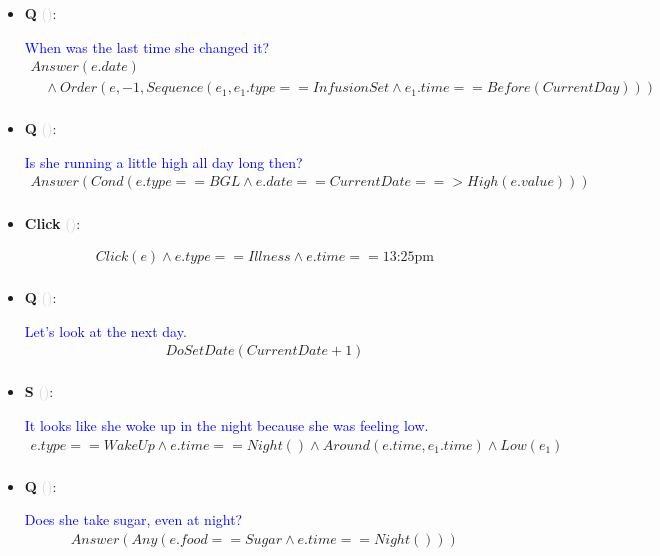 \documentclass[11pt]{article}
\newcounter{CQ}
\newcounter{CS}
\newcounter{CClick}
\newcommand{\key}[1]{\textcolor{lightgray}{#1}}
\begin{document}
\begin{itemize}
	\item
	\textbf{Q\theCQ} \key{()}: \addtocounter{CQ}{1}
	\textcolor{blue}{ When was the last time she changed it? }
	\begin{multline*}
	Answer(e.date) \\
	\hspace{1em}\wedge Order(e, -1, Sequence(e_1, e_1.type==InfusionSet \wedge e_1.time==Before(CurrentDay))) \\
	\end{multline*}
	
	
	\item
	\textbf{Q\theCQ} \key{()}: \addtocounter{CQ}{1}
	\textcolor{blue}{ Is she running a little high all day long then? }
	\begin{multline*}
	Answer(Cond(e.type==BGL \wedge e.date==CurrentDate ==> High(e.value))) \\
	\end{multline*}
	
	\item
	\textbf{Click\theCClick} \key{()}: \addtocounter{CClick}{1}
	\begin{multline*}
	Click(e) \wedge e.type == Illness \wedge e.time == \mbox{13:25pm}  \\
	\end{multline*}
	
	
	\item
	\textbf{Q\theCQ} \key{()}: \addtocounter{CQ}{1}
	\textcolor{blue}{ Let's look at the next day. }
	\begin{multline*}
	DoSetDate(CurrentDate + 1) \\
	\end{multline*}
	

	\item
	\textbf{S\theCS} \key{()}: \addtocounter{CS}{1}
	\textcolor{blue}{ It looks like she woke up in the night because she was feeling low. }
	\begin{multline*}
	e.type==WakeUp \wedge e.time==Night() \wedge Around(e.time, e_1.time) \wedge Low(e_1)  \\
	\end{multline*}
	
	\item
	\textbf{Q\theCQ} \key{()}: \addtocounter{CQ}{1}
	\textcolor{blue}{ Does she take sugar, even at night? }
	\begin{multline*}
	Answer(Any(e.food==Sugar \wedge e.time==Night()))  \\
	\end{multline*}
	

\end{itemize}
\end{document}
